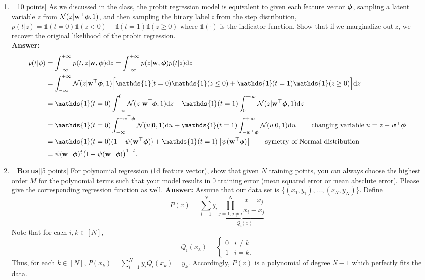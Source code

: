 \documentclass[12pt, fullpage,letterpaper]{article}
\def\red{\color{red}}
\def\blackblue{\color{black!40!blue}}
\begin{document}
\begin{enumerate}
\item~[10 points] As we discussed in the class, the probit regression model is equivalent to given each feature vector $\boldsymbol{\phi}$, sampling a latent variable $z$ from $\mathcal{N}(z|{\bf w}^\top \boldsymbol{\phi},1)$,  and then sampling the binary label $t$ from the step distribution, $p(t|z) = \mathds{1}(t=0)\mathds{1}(z< 0) + \mathds{1}(t=1)\mathds{1}(z\ge 0)$ where $\mathds{1}(\cdot)$ is the indicator function. Show that if we marginalize out $z$, we recover the original likelihood of the probit regression.  \\
	{\bf \red Answer:} {\blackblue 
	\begin{align*}
	p(t|\phi) & = \int_{-\infty}^{+\infty} p(t,z|\w,\bphi)\d z =  \int_{-\infty}^{+\infty} p(z|\w,\bphi)p(t|z)\d z\\
	& = \int_{-\infty}^{+\infty} \N(z|\w^\top \bphi,1)\Big[\mathds{1}(t=0)\mathds{1}(z\leq 0) + \mathds{1}(t=1)\mathds{1}(z\geq 0)\Big]\d z\\
	& = \mathds{1}(t=0)\int_{-\infty}^{0} \N(z|\w^\top \bphi,1) \d z + \mathds{1}(t=1)\int_{0}^{+\infty} \N(z|\w^\top \bphi,1)\d z\\
	& = \mathds{1}(t=0)\int_{-\infty}^{-w^\top \bphi} \N(u|\0,1) \d u + \mathds{1}(t=1)\int_{-w^\top \bphi}^{+\infty} \N(u|0,1)\d u\quad\quad\mbox{ changing variable $u = z-w^\top \bphi$}\\
	& = \mathds{1}(t=0)(1-\psi(\w^\top \bphi)) + \mathds{1}(t=1)\left[\psi(\w^\top \bphi)\right] \quad\quad\mbox{symetry of Normal distribution}\\
	& = \psi(\w^\top \bphi)^t\big(1-\psi(\w^\top \bphi)\big)^{1-t}.
	\end{align*}
	}
\vspace{-.5cm}
\item~[\textbf{Bonus}][5 points] For polynomial regression (1d feature vector), show that given $N$ training points, you can always choose the highest order $M$ for the polynomial terms such that your model results in $0$ training error (\eg mean squared error or mean absolute error).  Please give the corresponding regression function as well. 
	{\bf \red Answer:} {\blackblue Assume that our data set is $\{(x_1,y_1),\ldots,(x_N,y_N)\}$. 
	Define $$P(x) = \sum_{i=1}^Ny_i \underbrace{\prod_{j=1, j\neq i}^N\frac{x-x_j}{x_i-x_j}}_{=Q_i(x)}$$
	Note that for each $i,k\in[N]$,  
	$$Q_i(x_k) =\left\{
	\begin{array}{cc}
	0 & i\neq k\\
	1 & i=k.
	\end{array}\right.$$
	Thus, for each $k\in[N]$, 
	$P(x_k) = \sum_{i=1}^Ny_i Q_i(x_k) = y_k.$
	Accordingly, $P(x)$ is a polynomial of degree $N-1$ which perfectly fits the data. 
	} 
\end{enumerate}
\end{document}

